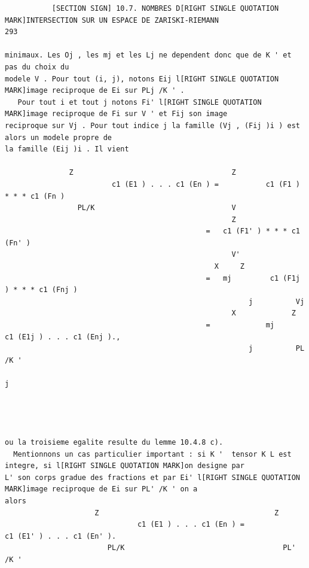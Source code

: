 \documentclass[
  11pt,
]{article}
\begin{document}
\begin{lstlisting}
           [SECTION SIGN] 10.7. NOMBRES D[RIGHT SINGLE QUOTATION MARK]INTERSECTION SUR UN ESPACE DE ZARISKI-RIEMANN                                    293

minimaux. Les Oj , les mj et les Lj ne dependent donc que de K ' et pas du choix du
modele V . Pour tout (i, j), notons Eij l[RIGHT SINGLE QUOTATION MARK]image reciproque de Ei sur PLj /K ' .
   Pour tout i et tout j notons Fi' l[RIGHT SINGLE QUOTATION MARK]image reciproque de Fi sur V ' et Fij son image
reciproque sur Vj . Pour tout indice j la famille (Vj , (Fij )i ) est alors un modele propre de
la famille (Eij )i . Il vient

               Z                                     Z
                         c1 (E1 ) . . . c1 (En ) =           c1 (F1 ) * * * c1 (Fn )
                 PL/K                                V
                                                     Z
                                               =   c1 (F1' ) * * * c1 (Fn' )
                                                     V'
                                                 X     Z
                                               =   mj         c1 (F1j ) * * * c1 (Fnj )
                                                         j          Vj
                                                     X             Z
                                               =             mj                 c1 (E1j ) . . . c1 (Enj ).,
                                                         j          PL /K '
                                                                         j




ou la troisieme egalite resulte du lemme 10.4.8 c).
  Mentionnons un cas particulier important : si K '  tensor K L est integre, si l[RIGHT SINGLE QUOTATION MARK]on designe par
L' son corps gradue des fractions et par Ei' l[RIGHT SINGLE QUOTATION MARK]image reciproque de Ei sur PL' /K ' on a
alors
                     Z                                         Z
                               c1 (E1 ) . . . c1 (En ) =                     c1 (E1' ) . . . c1 (En' ).
                        PL/K                                     PL' /K '


\end{lstlisting}
\end{document}
